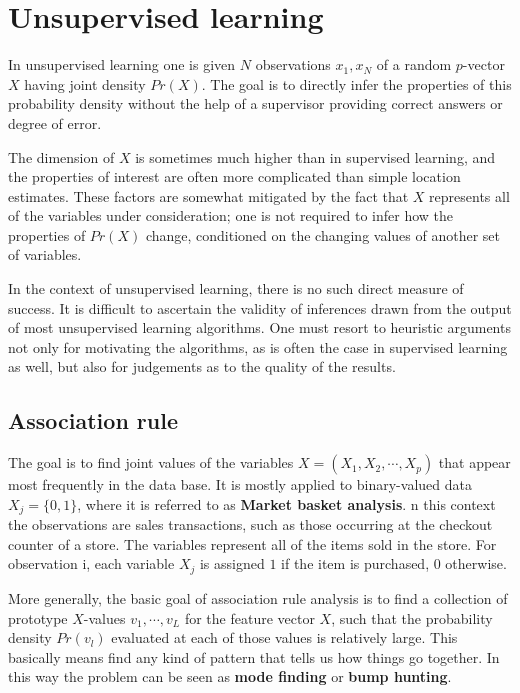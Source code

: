 \documentclass[12pt, letterpaper]{article}
\theoremstyle{definition}
\begin{document}
\section{Unsupervised learning}
In unsupervised learning one is given $N$ observations $x_1, x_N$ of a random $p$-vector $X$ having joint density $Pr(X)$. The goal is to directly infer the properties of this probability density without the help of a supervisor providing correct answers or degree of error. 

The dimension of $X$ is sometimes much higher than in supervised learning, and the properties of interest are often more complicated than simple location estimates. These factors are somewhat mitigated by the fact that $X$ represents all of the variables under consideration; one is not required to infer how the properties of $Pr(X)$ change, conditioned on the changing values of another set of variables.

In the context of unsupervised learning, there is no such direct measure of success. It is difficult to ascertain the validity of inferences drawn from the output of most unsupervised learning algorithms. One must resort to heuristic arguments not only for motivating the algorithms, as is often the case in supervised learning as well, but also for judgements as to the quality of the results. 

\subsection{Association rule}
The goal is to find joint values of the variables $X = (X_1, X_2, \cdots , X_p)$ that appear most frequently in the data base. It is mostly applied to binary-valued data $X_j = \{0,1\}$, where it is referred to as \textbf{Market basket analysis}. n this context the observations are sales transactions, such as those occurring at the checkout counter of a store. The variables represent all of the items sold in the store. For observation i, each variable $X_j$ is assigned $1$ if the item is purchased, $0$ otherwise.

More generally, the basic goal of association rule analysis is to find a collection of prototype $X$-values $v_1,\cdots,v_L$ for the feature vector $X$, such that the probability density $Pr(v_l)$ evaluated at each of those values is relatively large. This basically means find any kind of pattern that tells us how things go together. In this way the problem can be seen as \textbf{mode finding} or \textbf{bump hunting}.
\end{document}
